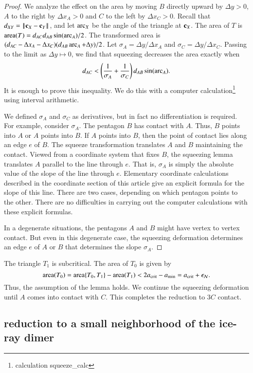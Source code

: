 \begin{proof}  
  We analyze the effect on the area by moving $B$ directly upward by
  $\Delta y >0$, $A$ to the right by $\Delta x_A >0$ and $C$ to the
  left by $\Delta x_C >0$.  Recall that $\dx{XY} = \dd{X}{Y}$, and let
  $\operatorname{arc}_X$ be the angle of the triangle at ${\mathbf c}_X$.  The area of $T$ is
  ${\operatorname{area}}(T) = d_{AC} d_{AB} \sin(\operatorname{arc}_A)/2$.  The transformed area is
  $(d_{AC}-\Delta x_A - \Delta x_C)(d_{AB}\operatorname{arc}_A + \Delta y)/2$.
   Let $\sigma_A = \Delta y/\Delta x_A$ and $\sigma_C = \Delta y
  /\Delta x_C$.  Passing to the limit as $\Delta y \mapsto 0$, we find
  that squeezing decreases the area exactly when
\[
d_{AC} < \left(\frac{1}{\sigma_A}
+\frac{1}{\sigma_C}\right)d_{AB}\sin(\operatorname{arc}_A).
\]
It is enough to prove this inequality.  We do this with a computer
calculation\footnote{calculation squeeze\_calc} using interval
arithmetic.

We defined $\sigma_A$ and $\sigma_C$ as derivatives, but in fact no
differentiation is required.  For example, consider $\sigma_A$.  The
pentagon $B$ has contact with $A$.  Thus, $B$ points into $A$ or $A$
points into $B$.  If $A$ points into $B$, then the point of contact
lies along an edge $e$ of $B$.  The squeeze transformation translates
$A$ and $B$ maintaining the contact.  Viewed from a coordinate system
that fixes $B$, the squeezing lemma translates $A$ parallel to the
line through $e$.  That is, $\sigma_A$ is simply the absolute value of
the slope of the line through $e$.  Elementary coordinate calculations
described in the coordinate section of this article give an explicit
formula for the slope of this line.  There are two cases, depending on
which pentagon points to the other.  There are no difficulties in
carrying out the computer calculations with these explicit formulas.

In a degenerate situations, the pentagons $A$ and $B$ might have
vertex to vertex contact. But even in this degenerate case, the
squeezing deformation determines an edge $e$ of $A$ or $B$ that
determines the slope $\sigma_A$.
\end{proof}

The triangle $T_1$ is subcritical.  The area of $T_0$ is given by
\[
{\operatorname{area}}(T_0) = {\operatorname{area}}\{T_0,T_1\} - {\operatorname{area}}(T_1) 
< 2a_\text{crit} - a_\text{min} = a_\text{crit}+\epsilon_{\mathcal N}.
\]
Thus, the assumption of the lemma holds.  We continue the squeezing
deformation until $A$ comes into contact with $C$.  This completes the
reduction to $3C$ contact.


\subsection{reduction to a small neighborhood of the ice-ray
  dimer}

